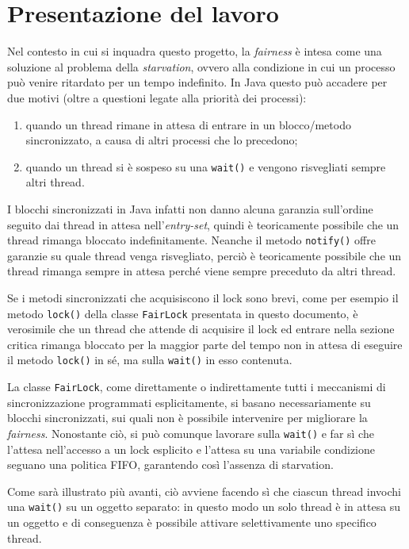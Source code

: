 \documentclass[a4paper,twoside]{article}
\newcommand\code{\lstinline[basicstyle=\normalsize\ttfamily]}
\begin{document}
\section{Presentazione del lavoro}

Nel contesto in cui si inquadra questo progetto, la \emph{fairness} è intesa come una soluzione al problema della \emph{starvation}, ovvero alla condizione in cui un processo può venire ritardato per un tempo indefinito. In Java questo può accadere per due motivi (oltre a questioni legate alla priorità dei processi):
%
\begin{enumerate}
\item quando un thread rimane in attesa di entrare in un blocco/metodo sincronizzato, a causa di altri processi che lo precedono;
\item quando un thread si è sospeso su una \texttt{wait()} e vengono risvegliati sempre altri thread.
\end{enumerate}
%
I blocchi sincronizzati in Java infatti non danno alcuna garanzia sull'ordine seguito dai thread in attesa nell'\emph{entry-set}, quindi è teoricamente possibile che un thread rimanga bloccato indefinitamente. Neanche il metodo \texttt{notify()} offre garanzie su quale thread venga risvegliato, perciò è teoricamente possibile che un thread rimanga sempre in attesa perché viene sempre preceduto da altri thread.

Se i metodi sincronizzati che acquisiscono il lock sono brevi, come per esempio il metodo \code|lock()| della classe \code|FairLock| presentata in questo documento, è verosimile che un thread che attende di acquisire il lock ed entrare nella sezione critica rimanga bloccato per la maggior parte del tempo non in attesa di eseguire il metodo \texttt{lock()} in sé, ma sulla \texttt{wait()} in esso contenuta.

La classe \code|FairLock|, come direttamente o indirettamente tutti i meccanismi di sincronizzazione programmati esplicitamente, si basano necessariamente su blocchi sincronizzati, sui quali non è possibile intervenire per migliorare la \emph{fairness}. Nonostante ciò, si può comunque lavorare sulla \texttt{wait()} e far sì che l'attesa nell'accesso a un lock esplicito e l'attesa su una variabile condizione seguano una politica FIFO, garantendo così l'assenza di starvation.

Come sarà illustrato più avanti, ciò avviene facendo sì che ciascun thread invochi una \texttt{wait()} su un oggetto separato: in questo modo un solo thread è in attesa su un oggetto e di conseguenza è possibile attivare selettivamente uno specifico thread.
\end{document}
